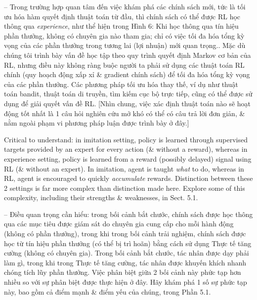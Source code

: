 \documentclass{article}
\begin{document}
\begin{itemize}
\begin{itemize}
        -- Trong trường hợp quan tâm đến việc khám phá các chính sách mới, tức là tối ưu hóa hàm quyết định thuật toán từ đầu, thì chính sách có thể được RL học thông qua {\it experience}, như thể hiện trong {\sf Hình 6: Khi học thông qua tín hiệu phần thưởng, không có chuyên gia nào tham gia; chỉ có việc tối đa hóa tổng kỳ vọng của các phần thưởng trong tương lai (lợi nhuận) mới quan trọng.}. Mặc dù chúng tôi trình bày vấn đề học tập theo quy trình quyết định Markov cơ bản của RL, nhưng điều này không ràng buộc người ta phải sử dụng các thuật toán RL chính (quy hoạch động xấp xỉ \& gradient chính sách) để tối đa hóa tổng kỳ vọng của các phần thưởng. Các phương pháp tối ưu hóa thay thế, ví dụ như thuật toán bandit, thuật toán di truyền, tìm kiếm cục bộ trực tiếp, cũng có thể được sử dụng để giải quyết vấn đề RL. [Nhìn chung, việc xác định thuật toán nào sẽ hoạt động tốt nhất là 1 câu hỏi nghiên cứu mở khó có thể có câu trả lời đơn giản, \& nằm ngoài phạm vi phương pháp luận được trình bày ở đây.]

        Critical to understand: in imitation setting, policy is learned through supervised targets provided by an expert for every action (\& without a reward), whereas in experience setting, policy is learned from a reward (possibly delayed) signal using RL (\& without an expert). In imitation, agent is taught {\it what} to do, whereas in RL, agent is encouraged to quickly {\it accumulate} rewards. Distinction between these 2 settings is far more complex than distinction made here. Explore some of this complexity, including their strengths \& weaknesses, in Sect. 5.1.

        -- Điều quan trọng cần hiểu: trong bối cảnh bắt chước, chính sách được học thông qua các mục tiêu được giám sát do chuyên gia cung cấp cho mỗi hành động (không có phần thưởng), trong khi trong bối cảnh trải nghiệm, chính sách được học từ tín hiệu phần thưởng (có thể bị trì hoãn) bằng cách sử dụng Thực tế tăng cường (không có chuyên gia). Trong bối cảnh bắt chước, tác nhân được dạy phải làm gì, trong khi trong Thực tế tăng cường, tác nhân được khuyến khích nhanh chóng tích lũy phần thưởng. Việc phân biệt giữa 2 bối cảnh này phức tạp hơn nhiều so với sự phân biệt được thực hiện ở đây. Hãy khám phá 1 số sự phức tạp này, bao gồm cả điểm mạnh \& điểm yếu của chúng, trong Phần 5.1.


\end{itemize}
\end{itemize}
\end{document}
